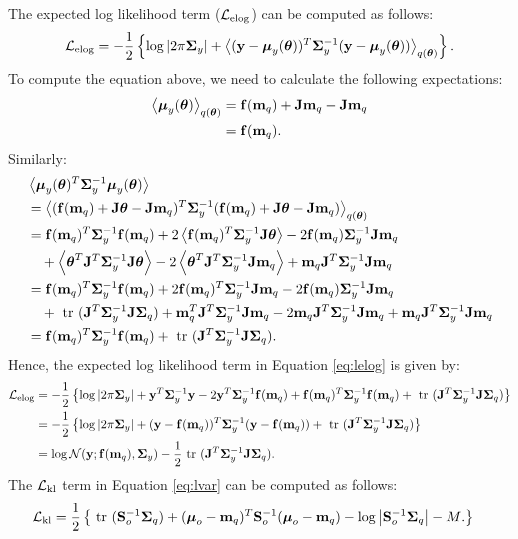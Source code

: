 The expected log likelihood term ($\lelog$) can be computed as follows:
\begin{align}
\label{eq:lelog}
\lelog = - \frac{1}{2} \left\{ \log \det{2 \pi \Sigmay} + \Eb{(\vecy - \muy(\vectheta))^{T} \Sigmay^{-1}(\vecy - \muy(\vectheta))}_{q(\vectheta)} \right\}
\text{.}
\end{align}
To compute the equation above, we need to calculate the following expectations:
\begin{align}
	\Eb{\muy(\vectheta)}_{q(\vectheta)} &= \vecf(\mq) + \J\mq - \J \mq \\
	&= \vecf(\mq) \text{.}
\end{align}
Similarly:
\begin{align}
	& \Eb{\mutheta^{T} \Sigmay^{-1} \mutheta} \\
	& = \Eb{(\fmq + \J\vectheta - \J \mq)^{T} \Sigmay^{-1} (\fmq + \J\vectheta - \J \mq)}_{\qtheta} \\
	&= \fmq^{T} \Sigmay^{-1} \fmq + 2\Eb{\fmq^{T} \Sigmay^{-1} \J \vectheta} - 2 \fmq \Sigmay^{-1} \J \mq   \\
	& \quad + \Eb{\vectheta^{T} \J^{T} \Sigmay^{-1} \J \vectheta}	      - 2\Eb{\vectheta^{T} \J^{T} \Sigmay^{-1} \J \mq} + \mq \J^{T} \Sigmay^{-1} \J \mq \\
	&= 
	\fmq^{T} \Sigmay^{-1} \fmq +  2 \fmq^{T} \Sigmay^{-1} \J \mq -  2 \fmq \Sigmay^{-1} \J \mq   \\
	& \quad + \trace(\J^{T} \Sigmay^{-1} \J \Sigmaq ) + \mq^{T} \J^{T} \Sigmay^{-1} \J \mq - 2 \mq \J^{T} \Sigmay^{-1} \J \mq 
		+  \mq \J^{T} \Sigmay^{-1} \J \mq \\
	& = \fmq^{T} \Sigmay^{-1} \fmq + \trace(\J^{T} \Sigmay^{-1} \J \Sigmaq ) \text{.}
\end{align}
Hence, the expected log likelihood term in Equation \eqref{eq:lelog} is given by:
\begin{align}
\label{eq:leloginit}
\lelog &= - \frac{1}{2} \left\{ \log \det{2 \pi \Sigmay} + \vecy^{T} \Sigmay^{-1} \vecy - 2\vec{y}^{T} \Sigmay^{-1} \fmq 
		+ \fmq^{T} \Sigmay^{-1} \fmq + \trace(\J^{T} \Sigmay^{-1} \J \Sigmaq ) 	\right\} \\
	&= 	- \frac{1}{2} \left\{ \log \det{2 \pi \Sigmay} + (\vecy - \fmq)^{T} \Sigmay^{-1} (\vecy - \fmq) 
					+ \trace(\J^{T} \Sigmay^{-1} \J \Sigmaq ) \right\} \\
\label{eq:lelogend}					
	& = \log \Normal(\vecy; \fmq, \Sigmay) - \frac{1}{2} \trace(\J^{T} \Sigmay^{-1} \J \Sigmaq ) \text{.}
\end{align}
%
The $\lkl$ term in Equation \eqref{eq:lvar} can be computed as follows:
\begin{align}
\lkl
& = \frac{1}{2} 
	\left\{ 
		\trace(\Sigmao^{-1} \Sigmaq) + (\muo - \mq)^{T} \Sigmao^{-1} (\muo - \mq) - \log \det{\Sigmao^{-1} \Sigmaq} - M \text{.}
	\right\}
\end{align}
%
